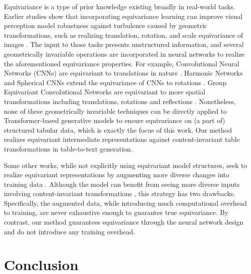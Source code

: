 \documentclass[11pt]{article}
\newcommand{\stitle}[1]{\vspace{1ex} \noindent{\bf #1.}}
\begin{document}
\stitle{Equivariant Representation Learning}
Equivariance is a type of prior knowledge existing broadly in real-world tasks.
Earlier studies show that incorporating equivariance learning can improve visual perception model
robustness against turbulence caused by geometric transformations, 
such as realizing translation, rotation, and scale equivariance of images \citep{lenc2015understanding, worrall2017harmonic, ravanbakhsh2017equivariance, sosnovik2019scale, yang2020rotation}.
The input to those tasks presents unstructured information, 
and several geometrically invariable operations are incorporated in neural networks to realize the aforementioned equivariance properties.
For example, Convolutional Neural Networks (CNNs) are equivariant to translations in nature \citep{lenc2015understanding}.
Harmonic Networks and Spherical CNNs extend the equivariance of CNNs to rotations \citep{worrall2017harmonic, esteves2018learning}.
Group Equivariant Convolutional Networks are equivariant to more spatial transformations including translations, rotations and reflections \citep{cohen2016group}.
Nonetheless, none of these geometrically invariable techniques can be directly applied to Transformer-based generative models to ensure equivariance on (a part of) structured tabular data, which is exactly the focus of this work. 
Our method realizes equivariant intermediate representations against content-invariant table transformations in table-to-text generation.

Some other works, while not explicitly using equivariant model structures, seek to realize equivariant representations by augmenting more diverse changes into training data \citep{chen2020group, wu2020generalization}. 
Although the model can benefit from seeing more diverse inputs involving content-invariant transformations \citep{wu2020generalization}, this strategy has two drawbacks. Specifically, the augmented data, while introducing much computational overhead to training, are never exhaustive enough to guarantee true equivariance.
By contrast, our method guarantees equivariance through the neural network design and do not introduce any training overhead.







 \section{Conclusion}
\end{document}
